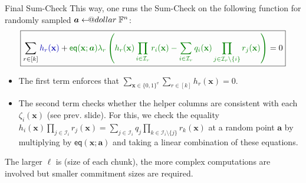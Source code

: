 \documentclass{zkdl-presentation-template}
\makeatletter
\newcommand\leftarrowS{\leftarrow\joinrel\smalldollar}
\newcommand{\smalldollar}{\mathrel{\mathpalette\small@dollar\relax}}
\newcommand{\small@dollar}[2]{%
  \vcenter{\hbox{%
    $#1\textnormal{\fontsize{0.7\dimexpr\f@size pt}{0}\selectfont\$}$%
  }}%
}
\makeatother
\begin{document}
    \begin{frame}{Final Sum-Check}
        This way, one runs the Sum-Check on the following function for
        randomly sampled $\boldsymbol{a} \leftarrowS \mathbb{F}^n$:
        \begin{equation*}
            \boxed{\sum_{r \in [k]} \textcolor{blue!70!black}{h_r(\mathbf{x})} + \textcolor{green!50!black}{\mathsf{eq}(\mathbf{x};\boldsymbol{a})\lambda_r\left(h_r(\mathbf{x})\prod_{i \in \mathcal{I}_r}r_i(\mathbf{x}) - \sum_{i \in \mathcal{I}_r}q_i(\mathbf{x})\prod_{j \in \mathcal{I}_r \setminus \{i\}} r_j(\mathbf{x})\right)} = 0}
        \end{equation*}

        \begin{itemize}
            \item The \textcolor{blue!70!black}{first term} enforces that
            $\sum_{\mathbf{x} \in \{0,1\}^v}\sum_{r \in [k]}h_r(\mathbf{x}) =
            0$.
            \item The \textcolor{green!50!black}{second term} checks whether the
            helper columns are consistent with each $\zeta_i(\mathbf{x})$ (see
            prev. slide). For this, we check the equality
            $h_i(\mathbf{x})\prod_{j \in \mathcal{I}_i}r_j(\mathbf{x}) = \sum_{j
            \in \mathcal{I}_i}q_j\prod_{k \in \mathcal{I}_i \setminus
            \{j\}}r_k(\mathbf{x})$ at a random point $\boldsymbol{a}$ by
            multiplying by $\mathsf{eq}(\mathbf{x};\boldsymbol{a})$ and taking a
            linear combination of these equations.
        \end{itemize}

        \begin{lemma}
            The larger $\ell$ is (size of each chunk), the more complex
            computations are involved but smaller commitment sizes are required. 
        \end{lemma}
    \end{frame}
\end{document}
